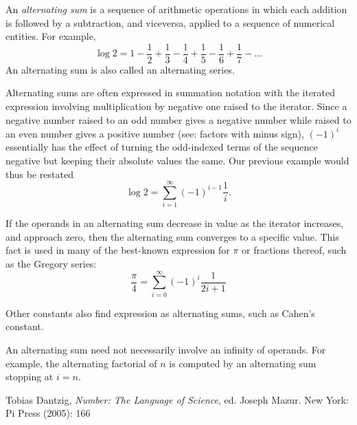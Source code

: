 \documentclass[12pt]{article}
\begin{document}
An {\em alternating sum} is a sequence of arithmetic operations in which each addition is followed by a subtraction, and viceversa, applied to a sequence of numerical entities. For example, $$\log 2 = 1 - \frac{1}{2} + \frac{1}{3} - \frac{1}{4} + \frac{1}{5} - \frac{1}{6} + \frac{1}{7} - \ldots$$ An alternating sum is also called an alternating series.

Alternating sums are often expressed in summation notation with the iterated expression involving multiplication by negative one raised to the iterator. Since a negative number raised to an odd number gives a negative number while raised to an even number gives a positive number (see: factors with minus sign), $(-1)^i$ essentially has the effect of turning the odd-indexed terms of the sequence negative but keeping their absolute values the same. Our previous example would thus be restated $$\log 2 = \sum_{i = 1}^\infty (-1)^{i - 1} \frac{1}{i}.$$

If the operands in an alternating sum decrease in value as the iterator increases, and approach zero, then the alternating sum converges to a specific value. This fact is used in many of the best-known expression for $\pi$ or fractions thereof, such as the Gregory series: $$\frac{\pi}{4} = \sum_{i = 0}^\infty (-1)^i \frac{1}{2i + 1}$$

Other constants also find expression as alternating sums, such as Cahen's constant.

An alternating sum need not necessarily involve an infinity of operands. For example, the alternating factorial of $n$ is computed by an alternating sum stopping at $i = n$.

\begin{thebibliography}{1}
 Tobias Dantzig, {\it Number: The Language of Science}, ed. Joseph Mazur. New York: Pi Press (2005): 166
\end{thebibliography}
\end{document}
